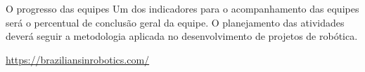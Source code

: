 \begin{frame}[t]{O progresso das equipes}
    Um dos indicadores para o acompanhamento das equipes será o percentual de conclusão geral da equipe.
    O planejamento das atividades deverá seguir a metodologia aplicada no desenvolvimento de projetos de robótica.
    \newline
    
    \url{https://braziliansinrobotics.com/}
\end{frame}
